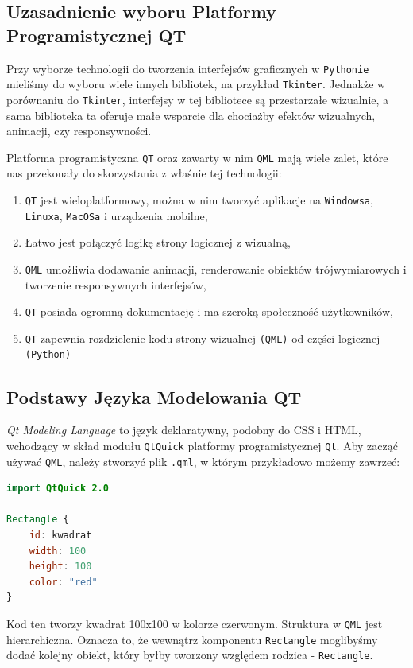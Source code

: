 \subsection{Uzasadnienie wyboru Platformy Programistycznej QT}
\label{sec:UzasadnienieWyboruPlatformyProgramistycznejQT}
Przy wyborze technologii do tworzenia interfejsów graficznych w \texttt{Pythonie} mieliśmy do wyboru wiele innych bibliotek, na przykład \texttt{Tkinter}. 
Jednakże w porównaniu do \texttt{Tkinter}, interfejsy w tej bibliotece są przestarzałe wizualnie, a sama biblioteka ta oferuje małe wsparcie dla chociażby efektów wizualnych, animacji, czy responsywności.

Platforma programistyczna \texttt{QT} oraz zawarty w nim \texttt{QML} mają wiele zalet, które nas przekonały do skorzystania z właśnie tej technologii:
\begin{enumerate}
    \item \texttt{QT} jest wieloplatformowy, można w nim tworzyć aplikacje na \texttt{Windowsa}, \texttt{Linuxa}, \texttt{MacOSa} i urządzenia mobilne,
    \item Łatwo jest połączyć logikę strony logicznej z wizualną,
    \item \texttt{QML} umożliwia dodawanie animacji, renderowanie obiektów trójwymiarowych i tworzenie responsywnych interfejsów,
    \item \texttt{QT} posiada ogromną dokumentację i ma szeroką społeczność użytkowników,
    \item \texttt{QT} zapewnia rozdzielenie kodu strony wizualnej \texttt{(QML)} od części logicznej \texttt{(Python)}
\end{enumerate}

\subsection{Podstawy Języka Modelowania QT} 
\label{sec:PodstawyJezykaModelowaniaQT}
\emph{Qt Modeling Language} to język deklaratywny, podobny do CSS i HTML, wchodzący w skład modułu \texttt{QtQuick} platformy programistycznej \texttt{Qt}. Aby zacząć używać \texttt{QML}, należy stworzyć plik \texttt{.qml}, w którym przykładowo możemy zawrzeć:

\begin{lstlisting}[language=QML, caption={Przykładowy kod QML}]
import QtQuick 2.0

Rectangle {
    id: kwadrat
    width: 100
    height: 100
    color: "red"
}
\end{lstlisting}
Kod ten tworzy kwadrat 100x100 w kolorze czerwonym. Struktura w \texttt{QML} jest hierarchiczna. Oznacza to, że wewnątrz komponentu \texttt{Rectangle} moglibyśmy dodać kolejny obiekt, który byłby tworzony względem rodzica - \texttt{Rectangle}.

